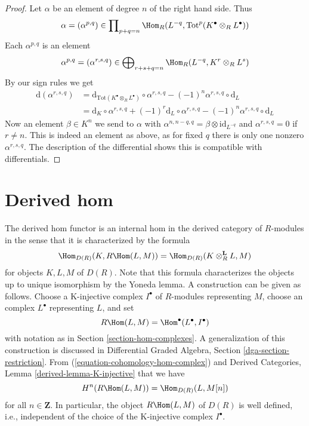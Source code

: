 \begin{proof}
Let $\alpha$ be an element of degree $n$ of the right hand side.
Thus
$$
\alpha = (\alpha^{p, q}) \in \prod\nolimits_{p + q = n}
\Hom_R(L^{-q}, \text{Tot}^p(K^\bullet \otimes_R L^\bullet))
$$
Each $\alpha^{p, q}$ is an element
$$
\alpha^{p, q} = (\alpha^{r, s, q}) \in
\bigoplus\nolimits_{r + s + q = n} \Hom_R(L^{-q}, K^r \otimes_R L^s)
$$
By our sign rules we get
\begin{align*}
\text{d}(\alpha^{r, s, q})
& =
\text{d}_{\text{Tot}(K^\bullet \otimes_R L^\bullet)} \circ \alpha^{r, s, q}
- (-1)^n \alpha^{r, s, q} \circ \text{d}_L \\
& =
\text{d}_K \circ \alpha^{r, s, q} + (-1)^r \text{d}_L \circ \alpha^{r, s, q}
- (-1)^n \alpha^{r, s, q} \circ \text{d}_L
\end{align*}
Now an element $\beta \in K^n$ we send to $\alpha$ with
$\alpha^{n, n - q, q} = \beta \otimes \text{id}_{L^{-q}}$
and $\alpha^{r, s, q} = 0$ if $r \not = n$. This is indeed
an element as above, as for fixed $q$ there is only one nonzero
$\alpha^{r, s, q}$. The description of
the differential shows this is compatible with differentials.
\end{proof}




\section{Derived hom}
\label{section-RHom}

\noindent
The derived hom functor is an internal hom in the derived category of
$R$-modules in the sense that it is characterized by the formula
\begin{equation}
\label{equation-internal-hom}
\Hom_{D(R)}(K, R\Hom(L, M))
=
\Hom_{D(R)}(K \otimes_R^\mathbf{L} L, M)
\end{equation}
for objects $K, L, M$ of $D(R)$. Note that this formula characterizes
the objects up to unique isomorphism by the Yoneda lemma. A construction
can be given as follows. Choose a K-injective complex $I^\bullet$
of $R$-modules representing $M$, choose an complex $L^\bullet$
representing $L$, and set
$$
R\Hom(L, M) = \Hom^\bullet(L^\bullet, I^\bullet)
$$
with notation as in Section \ref{section-hom-complexes}.
A generalization of this construction is discussed in
Differential Graded Algebra, Section \ref{dga-section-restriction}.
From (\ref{equation-cohomology-hom-complex}) and
Derived Categories, Lemma \ref{derived-lemma-K-injective}
that we have
\begin{equation}
\label{equation-h0-RHom}
H^n(R\Hom(L, M)) = \Hom_{D(R)}(L, M[n])
\end{equation}
for all $n \in \mathbf{Z}$. In particular, the object
$R\Hom(L, M)$ of $D(R)$ is well defined, i.e., independent of
the choice of the K-injective complex $I^\bullet$.

